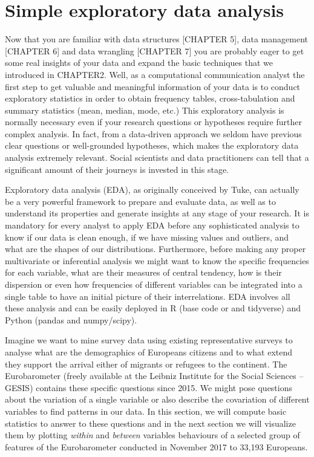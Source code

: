 \section{Simple exploratory data analysis}

Now that you are familiar with data structures [CHAPTER 5], data management [CHAPTER 6] and data wrangling [CHAPTER 7] you are probably eager to get some real insights of your data and expand the basic techniques that we introduced in CHAPTER2. Well, as a computational communication analyst the first step to get valuable and meaningful information of your data is to conduct exploratory statistics in order to obtain frequency tables, cross-tabulation and summary statistics (mean, median, mode, etc.)  This exploratory analysis is normally necessary even if your research questions or hypotheses require further complex analysis. In fact, from a data-driven approach we seldom have previous clear questions or well-grounded hypotheses, which makes the exploratory data analysis extremely relevant. Social scientists and data practitioners can tell that a significant amount of their journeys is invested in this stage.

Exploratory data analysis (EDA), as originally conceived by Tuke\cite{tukey1977exploratory}, can actually be a very powerful framework to prepare and evaluate data, as well as to understand its properties and generate insights at any stage of your research.  It is mandatory for every analyst to apply EDA before any sophisticated analysis to know if our data is clean enough, if we have missing values and outliers, and what are the shapes of our distributions. Furthermore, before making any proper multivariate or inferential analysis we might want to know the specific frequencies for each variable, what are their measures of central tendency, how is their dispersion or even how frequencies of different variables can be integrated into a single table to have an initial picture of their interrelations. EDA involves all these analysis and can be easily deployed in R (base code or and tidyverse) and Python (pandas and numpy/scipy).

Imagine we want to mine survey data using existing representative surveys to analyse what are the demographics of Europeans citizens and to what extend they support the arrival either of migrants or refugees to the continent. The Eurobarometer (freely available at the Leibniz Institute for the Social Sciences – GESIS) contains these specific questions since 2015. We might pose questions about the variation of a single variable or also describe the covariation of different variables to find patterns in our data. In this section, we will compute basic statistics to answer to these questions and in the next section we will visualize them by plotting \textit{within} and \textit{between} variables behaviours of a selected group of features of the Eurobarometer conducted in November 2017 to 33,193 Europeans. 



